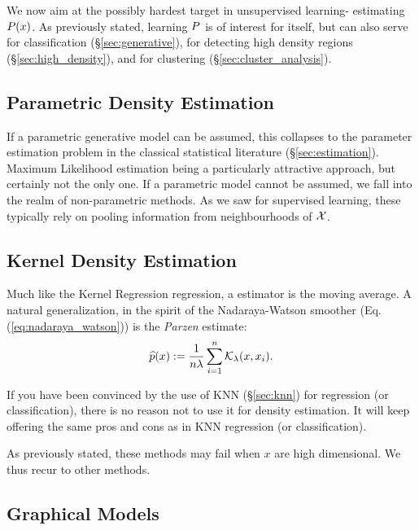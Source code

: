 We now aim at the possibly hardest target in unsupervised learning- estimating $P(x)$.
As previously stated, learning $P$ is of interest for itself, but can also serve for classification (\S\ref{sec:generative}), for detecting high density regions (\S\ref{sec:high_density}), and for clustering (\S\ref{sec:cluster_analysis}).




\subsection{Parametric Density Estimation}
If a parametric generative model can be assumed, this collapses to the parameter estimation problem in the classical statistical literature (\S\ref{sec:estimation}). Maximum Likelihood estimation being a particularly attractive approach, but certainly not the only one.
If a parametric model cannot be assumed, we fall into the realm of non-parametric methods. 
As we saw for supervised learning, these typically rely on pooling information from neighbourhoods of $\mathcal{X}$.



\subsection{Kernel Density Estimation}
\label{sec:kernel_density}

Much like the Kernel Regression regression, a \naive estimator is the moving average.
A natural generalization, in the spirit of the Nadaraya-Watson smoother (Eq.(\ref{eq:nadaraya_watson})) is the \emph{Parzen} estimate:
\begin{align}
\label{eq:parzen}
	\widehat{p}(x):=\frac{1}{n \lambda} \sum_{i=1}^n \mathcal{K}_\lambda(x,x_i).
\end{align}

\begin{remark}
If you have been convinced by the use of KNN (\S\ref{sec:knn}) for regression (or classification), there is no reason not to use it for density estimation. It will keep offering the same pros and cons as in KNN regression (or classification).
\end{remark}

As previously stated, these methods may fail when $x$ are high dimensional. We thus recur to other methods.



\subsection{Graphical Models}
\label{sec:graphical_models}

